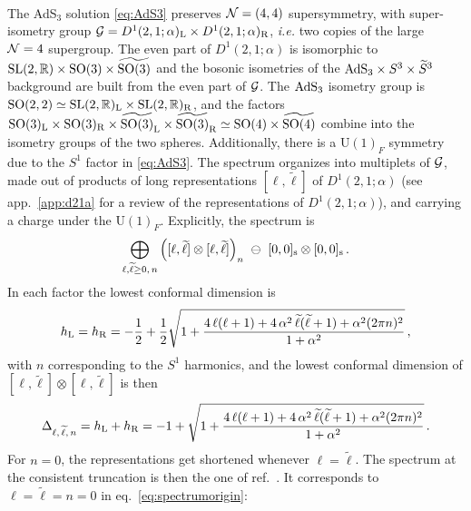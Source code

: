 \documentclass[a4paper, 11pt]{article}
\numberwithin{equation}{section}
\newcommand{\ts}[1]{\widetilde{#1}}
\newcommand{\U}[1]{\mathrm{U}(#1)}
\newcommand{\+}{\oplus}
\begin{document}
\paragraph{}
The AdS$_3$ solution \eqref{eq:AdS3} preserves ${\cal N}=(4,4)$ supersymmetry, with super-isometry group ${\cal G}=D^{1}(2,1;\alpha)_{\rm L}\times D^{1}(2,1;\alpha)_{\rm R}$, \textit{i.e.} two copies of the large ${\cal N}=4$ supergroup. The even part of $D^{1}(2,1;\alpha)$ is isomorphic to ${\rm SL}(2,\mathbb{R})\times{\rm SO}(3)\times\ts{{\rm SO}(3)}$ and the bosonic isometries of the ${\rm AdS}_{3}\times S^{3}\times\ts{S}^{3}$ background are built from the even part of ${\cal G}$. The ${\rm AdS}_{3}$ isometry group is ${\rm SO}(2,2)\simeq{\rm SL}(2,\mathbb{R})_{\rm L}\times{\rm SL}(2,\mathbb{R})_{\rm R}$, and the factors ${\rm SO}(3)_{\rm L}\times{\rm SO}(3)_{\rm R}\times\ts{{\rm SO}(3)}_{\rm L}\times\ts{{\rm SO}(3)}_{\rm R}\simeq{\rm SO}(4)\times\ts{{\rm SO}(4)}$ combine into the isometry groups of the two spheres. Additionally, there is a $\U{1}_F$ symmetry due to the $S^1$ factor in \eqref{eq:AdS3}. The spectrum organizes into multiplets of ${\cal G}$, made out of products of long representations $[\ell,\ts{\ell}]$ of $D^{1}(2,1;\alpha)$ (see app.~\ref{app:d21a} for a review of the representations of $D^{1}(2,1;\alpha)$), and carrying a charge under the $\U{1}_F$. Explicitly, the spectrum is~\cite{Eberhardt:2017fsi}
\begin{equation} \label{eq:spectrumorigin}
	\bigoplus_{\ell,\ts{\ell}\geq0,\,n} \Big([\ell,\ts{\ell}]\otimes[\ell,\ts{\ell}]\Big)_n \ \ominus\ [0,0]_{\rm s} \otimes [0,0]_{\rm s} \,.
\end{equation}
In each factor the lowest conformal dimension is
\begin{equation}
	h_{\rm L} = h_{\rm R} = -\frac{1}{2} + \frac{1}{2}\sqrt{1+\frac{4\,\ell(\ell+1)+4\,\alpha^{2}\,\ts{\ell}(\ts{\ell}+1)+\alpha^2(2\pi n)^{2}}{1+\alpha^{2}}}\,,
\end{equation}
with $n$ corresponding to the $S^{1}$ harmonics, and the lowest conformal dimension of $[\ell,\ts{\ell}]\otimes[\ell,\ts{\ell}]$ is then
\begin{equation} \label{eq:confdims3s3s1}
	\Delta_{\ell,\,\ts{\ell},\,n} = h_{\rm L} + h_{\rm R} = - 1 + \sqrt{1+\frac{4\,\ell(\ell+1)+4\,\alpha^{2}\,\ts{\ell}(\ts{\ell}+1)+\alpha^2(2\pi n)^{2}}{1+\alpha^{2}}}\,.
\end{equation}
For $n=0$, the representations get shortened whenever $\ell = \ts{\ell}$. The spectrum at the consistent truncation is then the one of ref.~\cite{Hohm:2005ui}. It corresponds to $\ell=\ts{\ell}=n=0$ in eq.~\eqref{eq:spectrumorigin}:
\end{document}
